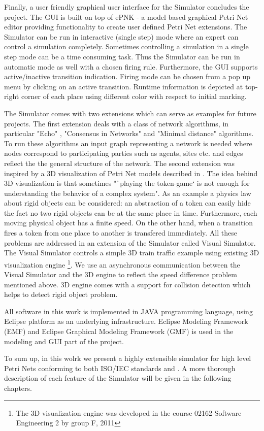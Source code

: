 Finally, a user friendly graphical user interface for the Simulator concludes the project. The GUI is built on top of ePNK \cite{epnk} - a model based graphical Petri Net editor providing functionality to create user defined Petri Net extensions. The Simulator can be run in interactive (single step) mode where an expert can control a simulation completely. Sometimes controlling a simulation in a single step mode can be a time consuming task. Thus the Simulator can be run in automatic mode as well with a chosen firing rule. Furthermore, the GUI supports active/inactive transition indication. Firing mode can be chosen from a pop up menu by clicking on an active transition. Runtime information is depicted at top-right corner of each place using different color with respect to initial marking.

The Simulator comes with two extensions which can serve as examples for future projects. The first extension deals with a class of network algorithms, in particular "Echo" \cite{echo}, "Consensus in Networks" \cite{reisig} and "Minimal distance" \cite{min-dist} algorithms. To run these algorithms an input graph representing a network is needed where nodes correspond to participating parties such as agents, sites etc. and edges reflect the the general structure of the network. The second extension was inspired by a 3D visualization of Petri Net models described in \cite{pnvis}. The idea behind 3D visualization is that sometimes "`playing the token-game` is not enough for understanding the behavior of a complex system". As an example a physics law about rigid objects can be considered: an abstraction of a token can easily hide the fact no two rigid objects can be at the same place in time. Furthermore, each moving physical object has a finite speed. On the other hand, when a transition fires a token from one place to another is transfered immediately. All these problems are addressed in an extension of the Simulator called Visual Simulator. The Visual Simulator controls a simple 3D train traffic example using existing 3D visualization engine \footnote{The 3D visualization engine was developed in the course 02162 Software Engineering 2 by group F, 2011}. We use an asynchronous communication between the Visual Simulator and the 3D engine to reflect the speed difference problem mentioned above. 3D engine comes with a support for collision detection which helps to detect rigid object problem.

All software in this work is implemented in JAVA programming language, using Eclipse platform \cite{website:eclipse} as an underlying infrastructure. Eclipse Modeling Framework (EMF) \cite{website:emf} and Eclipse Graphical Modeling Framework (GMF) \cite{website:gmf} is used in the modeling and GUI part of the project.

To sum up, in this wolrk we present a highly extensible simulator for high level Petri Nets conforming to both ISO/IEC standards \cite{15909-1:2004} and \cite{15909-2:2011}. A more thorough description of each feature of the Simulator will be given in the following chapters.

